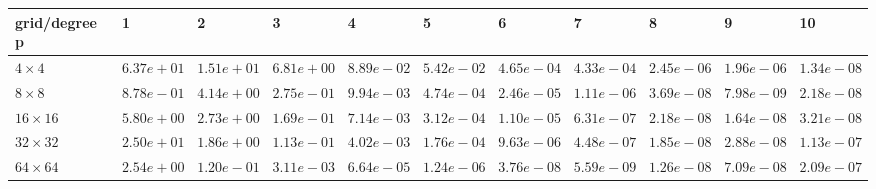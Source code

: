 \begin{tabular}{lllllllllll}
\hline
 grid/degree p   & 1          & 2          & 3          & 4          & 5          & 6          & 7          & 8          & 9          & 10         \\
\hline
 $4 \times 4$    & $6.37e+01$ & $1.51e+01$ & $6.81e+00$ & $8.89e-02$ & $5.42e-02$ & $4.65e-04$ & $4.33e-04$ & $2.45e-06$ & $1.96e-06$ & $1.34e-08$ \\
 $8 \times 8$    & $8.78e-01$ & $4.14e+00$ & $2.75e-01$ & $9.94e-03$ & $4.74e-04$ & $2.46e-05$ & $1.11e-06$ & $3.69e-08$ & $7.98e-09$ & $2.18e-08$ \\
 $16 \times 16$  & $5.80e+00$ & $2.73e+00$ & $1.69e-01$ & $7.14e-03$ & $3.12e-04$ & $1.10e-05$ & $6.31e-07$ & $2.18e-08$ & $1.64e-08$ & $3.21e-08$ \\
 $32 \times 32$  & $2.50e+01$ & $1.86e+00$ & $1.13e-01$ & $4.02e-03$ & $1.76e-04$ & $9.63e-06$ & $4.48e-07$ & $1.85e-08$ & $2.88e-08$ & $1.13e-07$ \\
 $64 \times 64$  & $2.54e+00$ & $1.20e-01$ & $3.11e-03$ & $6.64e-05$ & $1.24e-06$ & $3.76e-08$ & $5.59e-09$ & $1.26e-08$ & $7.09e-08$ & $2.09e-07$ \\
\hline
\end{tabular}